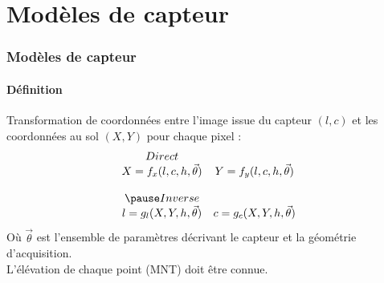 \documentclass[compress]{beamer}
\begin{document}


\section[Modèles]{Modèles de capteur}


\begin{frame}
  \frametitle{Modèles de capteur}

  \framesubtitle{Définition}
Transformation de coordonnées entre l'image issue du capteur $(l,c)$
et les coordonnées au sol $(X,Y)$ pour chaque pixel :
\pause
\begin{displaymath}
  \begin{array}{cc}
    Direct & \\
    X = f_x(l,c,h,\vec\theta) & Y = f_y(l,c,h,\vec\theta)\\
     & \\ \pause
    Inverse & \\
    l = g_l(X,Y,h,\vec\theta) & c = g_c(X,Y,h,\vec\theta)
  \end{array}
\end{displaymath}
\pause
Où $\vec\theta$ est l'ensemble de paramètres décrivant le capteur et
la géométrie d'acquisition.\\
\pause
L'élévation de chaque point (MNT) doit être connue.
  
\end{frame}
\end{document}
